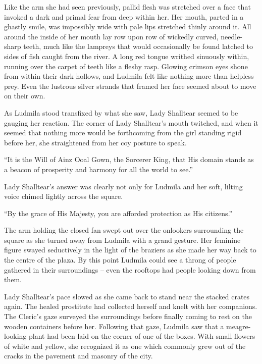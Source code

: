  

Like the arm she had seen previously, pallid flesh was stretched over a face that invoked a dark and primal fear from deep within her. Her mouth, parted in a ghastly smile, was impossibly wide with pale lips stretched thinly around it. All around the inside of her mouth lay row upon row of wickedly curved, needle-sharp teeth, much like the lampreys that would occasionally be found latched to sides of fish caught from the river. A long red tongue writhed sinuously within, running over the carpet of teeth like a fleshy rasp. Glowing crimson eyes shone from within their dark hollows, and Ludmila felt like nothing more than helpless prey. Even the lustrous silver strands that framed her face seemed about to move on their own.

 

As Ludmila stood transfixed by what she saw, Lady Shalltear seemed to be gauging her reaction. The corner of Lady Shalltear's mouth twitched, and when it seemed that nothing more would be forthcoming from the girl standing rigid before her, she straightened from her coy posture to speak.

 

“It is the Will of Ainz Ooal Gown, the Sorcerer King, that His domain stands as a beacon of prosperity and harmony for all the world to see.”

 

Lady Shalltear's answer was clearly not only for Ludmila and her soft, lilting voice chimed lightly across the square.

 

“By the grace of His Majesty, you are afforded protection as His citizens.”

 

The arm holding the closed fan swept out over the onlookers surrounding the square as she turned away from Ludmila with a grand gesture. Her feminine figure swayed seductively in the light of the braziers as she made her way back to the centre of the plaza. By this point Ludmila could see a throng of people gathered in their surroundings – even the rooftops had people looking down from them.

 

Lady Shalltear’s pace slowed as she came back to stand near the stacked crates again. The healed prostitute had collected herself and knelt with her companions. The Cleric’s gaze surveyed the surroundings before finally coming to rest on the wooden containers before her. Following that gaze, Ludmila saw that a meagre-looking plant had been laid on the corner of one of the boxes. With small flowers of white and yellow, she recognized it as one which commonly grew out of the cracks in the pavement and masonry of the city.


